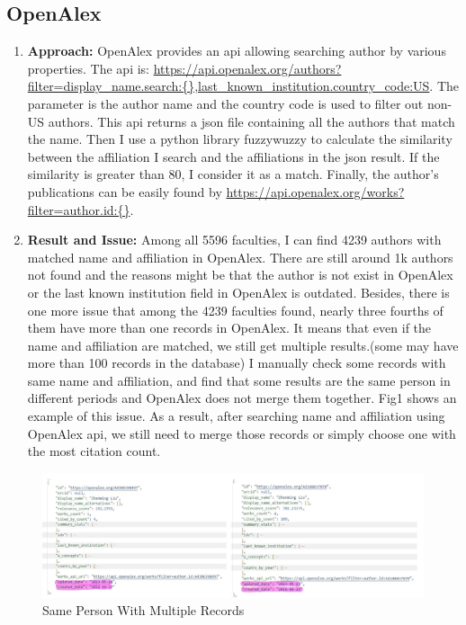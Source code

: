 \documentclass[../report.tex]{subfiles}
\begin{document}
\subsection{OpenAlex}
\begin{enumerate}
  \item \textbf{Approach: } OpenAlex provides an api allowing searching author by various properties. The api is: \url{https://api.openalex.org/authors?filter=display_name.search:{},last_known_institution.country_code:US}. The parameter is the author name and the country code is used to filter out non-US authors. This api returns a json file containing all the authors that match the name. Then I use a python library fuzzywuzzy to calculate the similarity between the affiliation I search and the affiliations in the json result. If the similarity is greater than 80, I consider it as a match. Finally, the author's publications can be easily found by \url{https://api.openalex.org/works?filter=author.id:{}}.
  \item \textbf{Result and Issue: } Among all 5596 faculties, I can find 4239 authors with matched name and affiliation in OpenAlex. There are still around 1k authors not found and the reasons might be that the author is not exist in OpenAlex or the last known institution field in OpenAlex is outdated. Besides, there is one more issue that among the 4239 faculties found, nearly three fourths of them have more than one records in OpenAlex. It means that even if the name and affiliation are matched, we still get multiple results.(some may have more than 100 records in the database) I manually check some records with same name and affiliation, and find that some results are the same person in different periods and OpenAlex does not merge them together. Fig1 shows an example of this issue. As a result, after searching name and affiliation using OpenAlex api, we still need to merge those records or simply choose one with the most citation count.

\end{enumerate}

\begin{figure}[htbp]
  \centering
  \includegraphics[width=1\textwidth]{./figs/multiple_records.jpg}
  \caption{Same Person With Multiple Records}
  \label{multiple_records}
\end{figure}
\end{document}
